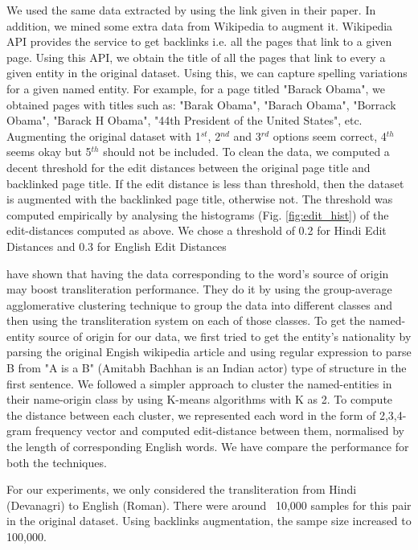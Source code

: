 \documentclass[11pt,a4paper]{article}
\begin{document}
We used the same data extracted by \citet{burch-1} using the link given in their paper. In addition, we mined some extra data from Wikipedia to augment it. Wikipedia API provides the service to get backlinks i.e. all the pages that link to a given page. Using this API, we obtain the title of all the pages that link to every a given entity in the original dataset. Using this, we can capture spelling variations for a given named entity. For example, for a page titled "Barack Obama", we obtained pages with titles such as: "Barak Obama", "Barach Obama", "Borrack Obama", "Barack H Obama", "44th President of the United States", etc. Augmenting the original dataset with 1$^{st}$, 2$^{nd}$ and 3$^{rd}$ options seem correct, 4$^{th}$ seems okay but 5$^{th}$ should not be included. To clean the data, we computed a decent threshold for the edit distances between the original page title and backlinked page title. If the edit distance is less than threshold, then the dataset is augmented with the backlinked page title, otherwise not. The threshold was computed empirically by analysing the histograms (Fig. \ref{fig:edit_hist}) of the edit-distances computed as above. We chose a threshold of 0.2 for Hindi Edit Distances and 0.3 for English Edit Distances

\par
\citet{huang-name-origin-1} have shown that having the data corresponding to the word's source of origin may boost transliteration performance. They do it by using the group-average agglomerative clustering technique to group the data into different classes and then using the transliteration system on each of those classes. To get the named-entity source of origin for our data, we first tried to get the entity's nationality by parsing the original Engish wikipedia article and using regular expression to parse B from "A is a B" (Amitabh Bachhan is an Indian actor) type of structure in the first sentence. We followed a simpler approach to cluster the named-entities in their name-origin class by using K-means algorithms with K as 2. To compute the distance between each cluster, we represented each word in the form of {2,3,4}-gram frequency vector and computed edit-distance between them, normalised by the length of corresponding English words. We have compare the performance for both the techniques. 
\par
For our experiments, we only considered the transliteration from Hindi (Devanagri) to English (Roman). There were around ~10,000 samples for this pair in the original dataset. Using backlinks augmentation, the sampe size increased to 100,000.
\end{document}
